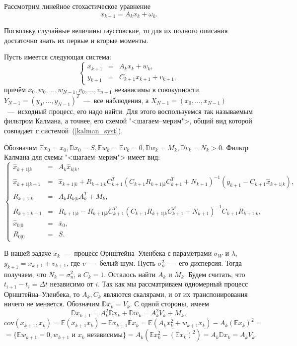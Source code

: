
Рассмотрим линейное стохастическое уравнение
\[
x_{k+1}=A_kx_k+\omega_k.
\]

Поскольку случайные величины гауссовские, то для их полного описания 
 достаточно знать их первые и вторые моменты.

Пусть имеется следующая система:
\begin{equation} \label{kalman_syst}
\left\lbrace
\begin{array}{rcl}
x_{k+1}&=&A_kx_k+w_k,\\
y_{k+1}&=&C_{k+1}x_{k+1}+v_{k+1},
\end{array}
\right.
\end{equation}
причём \( x_0, w_0,\ldots, w_{N-1},v_0,\ldots,v_{n-1} \) независимы в 
 совокупности. \( Y_{N-1}=(y_0,\ldots,y_{N-1})^T \)~---~все наблюдения, 
 а \( X_{N-1}=(x_0,\ldots,x_{N-1}) \)~---~исходный процесс, его надо найти. 
 Для этого воспользуемся так называемым фильтром Калмана, а точнее, его 
 схемой "<шагаем--мерим">, общий вид которой совпадает с 
 системой~(\ref{kalman_syst}). 

Обозначим \( \mathbb{E} x_0 = \overline{x}_0, \mathbb{D}x_0 = S, 
 \mathbb{E} w_k = \mathbb{E}v_k = 0, \mathbb{D} w_k = M_k, \mathbb{D}v_k = 
 N_k>0 \). Фильтр Калмана для схемы "<шагаем--мерим"> имеет вид:
\[
\left\lbrace
\begin{array}{rcl}
\hat{x}_{k+1|k}&=&A_k\hat{x}_{k|k},\\
\hat{x}_{k+1|k+1}&=&\hat{x}_{k+1|k}+R_{k+1|k}C^T_{k+1}(C_{k+1}R_{k+1|k} 
 C^T_{k+1}+N_{k+1})^{-1}(y_{k+1}-C_{k+1}\hat{x}_{k+1|k}),\\
R_{k+1|k}&=&A_kR_{k|k}A_k^T+M_k,\\
R_{k+1|k+1}&=&R_{k+1|k}-R_{k+1|k}C^T_{k+1}(C_{k+1}R_{k+1|k}C_{k+1}^T+
 N_{k+1})^{-1}C_{k+1}R_{k+1|k},\\
\hat{x}_{0|0}&=&\overline{x}_0,\\
R_{0|0}&=&S.
\end{array}
\right.
\]

В нашей задаче \( x_{k} \)~---~процесс Орнштейна--Уленбека с параметрами 
 \( \sigma_W \) и \( \lambda \), \( y_{k+1}=x_{k+1}+v_{k+1} \), где 
 \( v \)~---~белый шум. Пусть \( \sigma_n^2 \)~---~его дисперсия. Тогда 
 получаем, что \( N_k=\sigma_n^2 \), а \( C_k=1 \). Осталось найти 
 \( A_k \) и \( M_k \). Будем считать, что \( t_{i+1}-t_i=\Delta t \) 
 независимо от \( i \). Так как мы рассматриваем одномерный процесс 
 Орнштейна--Уленбека, то \( A_k,C_k \) являются скалярами, и от их 
 транспонирования ничего не меняется. Обозначим \( \mathbb{D}x_k=V_k \). 
 С одной стороны, имеем
\[
\mathbb{D}x_{k+1}=A_k^2\mathbb{D}x_{k}+\mathbb{D}w_k=A_k^2V_k+M_k,
\]
\[
\text{cov}(x_{k+1},x_k)=\mathbb{E}(x_{k+1}x_k)-\mathbb{E}x_{k+1}\mathbb{E}
 x_k=\mathbb{E}(A_kx_k^2+w_{k+1}x_{k})-A_k(\mathbb{E}x_k)^2=
\]
\[
=\lbrace\mathbb{E}w_{k+1}=0,w_{k+1}\text{ и }x_k\text{ независимы}\rbrace = 
 A_k\left(\mathbb{E}x_k^2-(\mathbb{E}x_k)^2\right)=A_k\mathbb{D}x_k=A_kV_k.
\]

